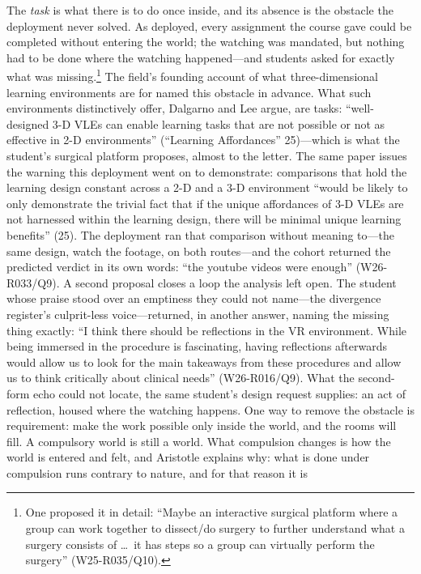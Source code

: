 The \textit{task} is what there is to do once inside, and its absence
is the obstacle the deployment never solved. As deployed, every
assignment the course gave could be completed without entering the
world; the watching was mandated, but nothing had to be done where the
watching happened---and students asked for exactly what was
missing.\footnote{One proposed it in detail: ``Maybe an interactive
surgical platform where a group can work together to dissect/do
surgery to further understand what a surgery consists of \ldots\ it
has steps so a group can virtually perform the surgery''
(W25-R035/Q10).} The field's founding account of what
three-dimensional learning environments are for named this obstacle in
advance. What such environments distinctively offer, Dalgarno and Lee
argue, are tasks: ``well-designed 3-D VLEs can enable learning tasks
that are not possible or not as effective in 2-D environments''
(``Learning Affordances'' 25)---which is what the student's surgical
platform proposes, almost
to the letter. The same paper issues the warning this deployment went
on to demonstrate: comparisons that hold the learning design constant
across a 2-D and a 3-D environment ``would be likely to only
demonstrate the trivial fact that if the unique affordances of 3-D
VLEs are not harnessed within the learning design, there will be
minimal unique learning benefits'' (25). The deployment ran that
comparison without meaning to---the same design, watch the footage, on
both routes---and the cohort returned the predicted verdict in its own
words: ``the youtube videos were enough'' (W26-R033/Q9). A second
proposal closes a loop the analysis left open. The student whose praise
stood over an emptiness they could not name---the divergence register's
culprit-less voice---returned, in another answer, naming the missing
thing exactly: ``I think there should be reflections in the VR
environment. While being immersed in the procedure is fascinating, having
reflections afterwards would allow us to look for the main takeaways from
these procedures and allow us to think critically about clinical needs''
(W26-R016/Q9). What the second-form echo could not locate, the same
student's design request supplies: an act of reflection, housed where the
watching happens. One way to
remove the obstacle is requirement: make
the work possible only inside the world, and the rooms will fill. A
compulsory world is still a world. What compulsion changes is how the
world is entered and felt, and Aristotle explains why: what is done under
compulsion runs contrary to nature, and for that reason it is
